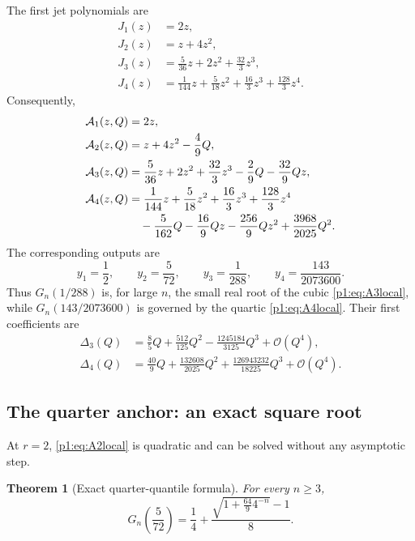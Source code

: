 \documentclass[11pt,oneside]{article}
\numberwithin{equation}{section}
\newtheorem{theorem}{Theorem}[section]
\theoremstyle{definition}
\theoremstyle{remark}
\newcommand{\bigO}{\mathcal O}
\begin{document}
The first jet polynomials are
\begin{align}
 J_1(z)&=2z,\label{p1:eq:J1}\\
 J_2(z)&=z+4z^2,\label{p1:eq:J2}\\
 J_3(z)&=\frac5{36}z+2z^2+\frac{32}{3}z^3,\label{p1:eq:J3}\\
 J_4(z)&=\frac1{144}z+\frac5{18}z^2+\frac{16}{3}z^3+\frac{128}{3}z^4.
 \label{p1:eq:J4}
\end{align}
Consequently,
\begin{align}
 \mathcal A_1(z,Q)&=2z,\label{p1:eq:A1local}\\
 \mathcal A_2(z,Q)&=z+4z^2-\frac49Q,\label{p1:eq:A2local}\\
 \mathcal A_3(z,Q)&=\frac5{36}z+2z^2+\frac{32}{3}z^3
 -\frac29Q-\frac{32}{9}Qz,\label{p1:eq:A3local}\\
 \mathcal A_4(z,Q)&=\frac1{144}z+\frac5{18}z^2+\frac{16}{3}z^3+\frac{128}{3}z^4
 \notag\\
 &\quad-\frac5{162}Q-\frac{16}{9}Qz-\frac{256}{9}Qz^2
 +\frac{3968}{2025}Q^2.
 \label{p1:eq:A4local}
\end{align}
The corresponding outputs are
\begin{equation}
 y_1=\frac12,
 \qquad y_2=\frac5{72},
 \qquad y_3=\frac1{288},
 \qquad y_4=\frac{143}{2073600}.
 \label{p1:eq:y-first}
\end{equation}
Thus $G_n(1/288)$ is, for large $n$, the small real root of the cubic
\eqref{p1:eq:A3local}, while $G_n(143/2073600)$ is governed by the quartic
\eqref{p1:eq:A4local}.  Their first coefficients are
\begin{align}
 \Delta_3(Q)&=\frac85Q+\frac{512}{125}Q^2
 -\frac{1245184}{3125}Q^3+\bigO(Q^4),
 \label{p1:eq:Delta3}\\
 \Delta_4(Q)&=\frac{40}{9}Q+\frac{132608}{2025}Q^2
 +\frac{126943232}{18225}Q^3+\bigO(Q^4).
 \label{p1:eq:Delta4}
\end{align}

\subsection{The quarter anchor: an exact square root}

At $r=2$, \eqref{p1:eq:A2local} is quadratic and can be solved without any
asymptotic step.

\begin{theorem}[Exact quarter-quantile formula]
\label{p1:thm:quarter-exact}
For every $n\ge3$,
\begin{equation}
 \boxed{
 G_n\!\left(\frac5{72}\right)
 =\frac14+\frac{\sqrt{1+\frac{64}{9}4^{-n}}-1}{8}.}
 \label{p1:eq:quarter-exact}
\end{equation}
\end{theorem}
\end{document}
